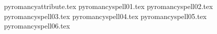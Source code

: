 

\tablelabels
{pyromancyattribute.tex}%
\spellrule
{pyromancyspell01.tex}%
\spellrule
{pyromancyspell02.tex}%
\spellrule
{pyromancyspell03.tex}%
\spellrule
{pyromancyspell04.tex}%
\spellrule
{pyromancyspell05.tex}%
\spellrule
{pyromancyspell06.tex}%
\closetable{}
